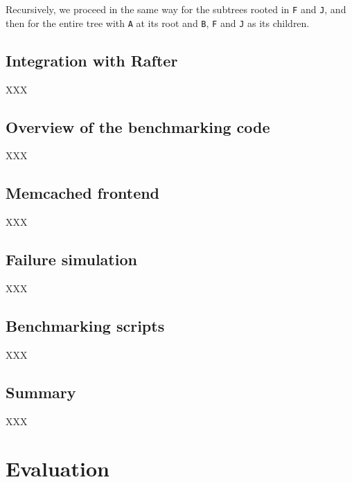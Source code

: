 \documentclass[11pt,chapterprefix=true,toc=bibliography,numbers=noendperiod,
               footnotes=multiple,twoside]{scrreprt}
\begin{document}
Recursively, we proceed in the same way for the subtrees rooted in \texttt{F} and \texttt{J}, and then for the entire tree with \texttt{A} at its root and \texttt{B}, \texttt{F} and \texttt{J} as its children.

\section{Integration with Rafter}

XXX

\section{Overview of the benchmarking code}

XXX

\section{Memcached frontend}

XXX

\section{Failure simulation}

XXX

\section{Benchmarking scripts}

XXX

\section{Summary}

XXX

\chapter{Evaluation\label{ch:evaluation}}

\end{document}
